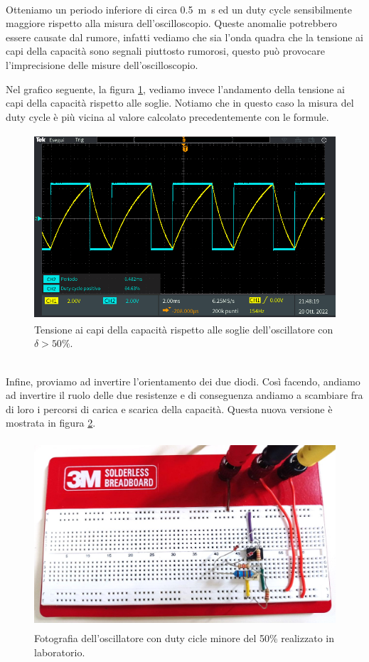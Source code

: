 \documentclass{report}
\begin{document}
\\[4pt]Otteniamo un periodo inferiore di circa \SI{0.5}{m\second} ed un duty cycle sensibilmente maggiore rispetto alla misura dell'oscilloscopio. Queste anomalie potrebbero essere causate dal rumore, infatti vediamo che sia l'onda quadra che la tensione ai capi della capacità sono segnali piuttosto rumorosi, questo può provocare l'imprecisione delle misure dell'oscilloscopio.\par
Nel grafico seguente, la figura \ref{figura:oscillo4_1_soglie}, vediamo invece l'andamento della tensione ai capi della capacità rispetto alle soglie. Notiamo che in questo caso la misura del duty cycle è più vicina al valore calcolato precedentemente con le formule.
\begin{figure}[h!]
	\centering
	\includegraphics[height=6.9cm]{immagini/TEK00038}
	\caption{Tensione ai capi della capacità rispetto alle soglie dell'oscillatore con $\delta>50\%$.}
	\label{figura:oscillo4_1_soglie}
\end{figure}
\\Infine, proviamo ad invertire l'orientamento dei due diodi. Così facendo, andiamo ad invertire il ruolo delle due resistenze e di conseguenza andiamo a scambiare fra di loro i percorsi di carica e scarica della capacità. Questa nuova versione è mostrata in figura \ref{figura:circuito4_2}.
\begin{figure}[h!]
	\centering
	\includegraphics[height=7cm]{immagini/circuito4_2.jpg}
	\caption{Fotografia dell'oscillatore con duty cicle minore del 50\% realizzato in laboratorio.}
	\label{figura:circuito4_2}
\end{figure}
\end{document}
